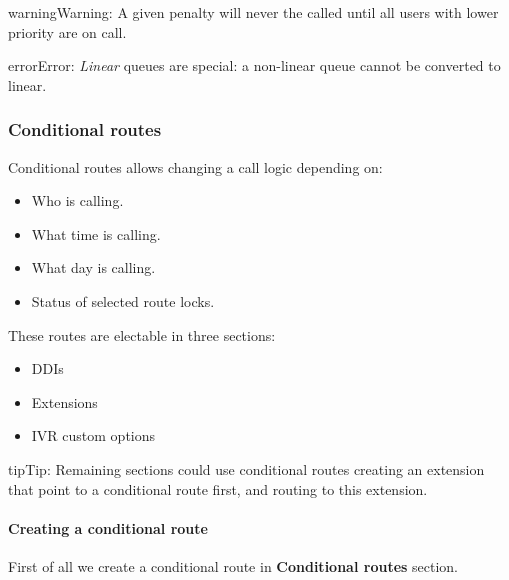 \documentclass[letterpaper,10pt,english]{sphinxmanual}
\begin{document}
\begin{notice}{warning}{Warning:}
A given penalty will never the called until all users with lower priority are on call.
\end{notice}

\begin{notice}{error}{Error:}
\emph{Linear} queues are special: a non-linear queue cannot be converted to linear.
\end{notice}


\subsubsection{Conditional routes}
\label{administration_portal/client/vpbx/routing_endpoints/conditional_routes::doc}\label{administration_portal/client/vpbx/routing_endpoints/conditional_routes:conditional-routes}\label{administration_portal/client/vpbx/routing_endpoints/conditional_routes:id1}
Conditional routes allows changing a call logic depending on:
\begin{itemize}
\item {} 
Who is calling.

\item {} 
What time is calling.

\item {} 
What day is calling.

\item {} 
Status of selected route locks.

\end{itemize}

These routes are electable in three sections:
\begin{itemize}
\item {} 
DDIs

\item {} 
Extensions

\item {} 
IVR custom options

\end{itemize}

\begin{notice}{tip}{Tip:}
Remaining sections could use conditional routes creating an extension
that point to a conditional route first, and routing to this extension.
\end{notice}


\paragraph{Creating a conditional route}
\label{administration_portal/client/vpbx/routing_endpoints/conditional_routes:creating-a-conditional-route}
First of all we create a conditional route in \textbf{Conditional routes} section.
\end{document}
